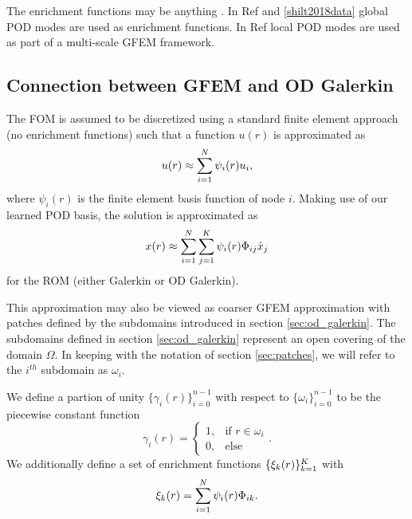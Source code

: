 The enrichment functions may be anything .
In Ref \cite{aquino2009generalized} and \ref{shilt2018data} global POD modes are used as enrichment functions.
In Ref \cite{babuska2011optimal} local POD modes are used as part of a multi-scale GFEM framework.

\subsection{Connection between GFEM and OD Galerkin}

The FOM is assumed to be discretized using a standard finite element approach (no enrichment functions) such that a function $u(r)$ is approximated as 
\begin{equation}
\label{eq:fem}
u(r) \approx \sum_{i=1}^N \psi_i(r) u_i,
\end{equation}
where $\psi_i(r)$ is the finite element basis function of node $i$.
Making use of our learned POD basis, the solution is approximated as
\begin{equation}
x(r) \approx \sum_{i=1}^N \sum_{j=1}^K \psi_i(r) \Phi_{ij}\hat{x}_j
\end{equation}
for the ROM (either Galerkin or OD Galerkin).

This approximation may also be viewed as coarser GFEM approximation with patches defined by the subdomains introduced in section \ref{sec:od_galerkin}.
The subdomains defined in section \ref{sec:od_galerkin} represent an open covering of the domain $\Omega$.
In keeping with the notation of section \ref{sec:patches}, we will refer to the $i^{th}$ subdomain as $\omega_i$.

We define a partion of unity $\lbrace\gamma_i(r)\rbrace_{i=0}^{n-1}$ with respect to $\lbrace\omega_i\rbrace_{i=0}^{n-1}$
to be the piecewise constant function
\begin{equation}
\gamma_i(r) = 
\begin{cases}
1,& \text{if } r\in\omega_i \\
0,& \text{else}
\end{cases}. 
\end{equation}
We additionally define a set of enrichment functions $\lbrace\xi_k(r)\rbrace_{k=1}^K$ with
\begin{equation}
\xi_k(r) = \sum_{i=1}^N \psi_i(r) \Phi_{ik}.
\end{equation}

